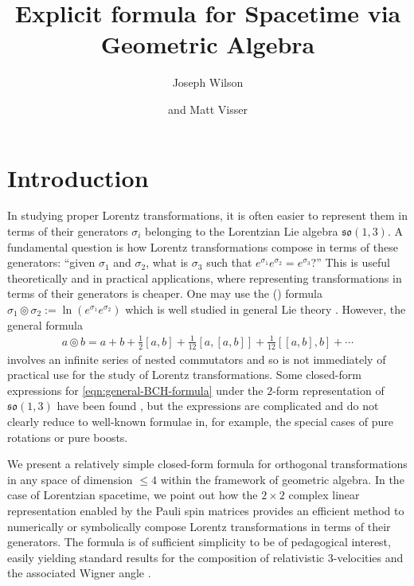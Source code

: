 \documentclass[12pt,a4paper]{article}
\title{Explicit \x{BCH full} formula for Spacetime via Geometric Algebra}
\author{Joseph Wilson \orcidJoseph}
\author{{\sf and} Matt Visser \orcidMatt}
\affiliation{
	School of Mathematics and Statistics, Victoria University of Wellington,
\\	\null\qquad PO Box 600, Wellington 6140, New Zealand
\\[2ex]	\toself{Compiled on \today\ at \currenttime.}
}
\makeatletter
\newcommand\x[1]{\@nameuse{\detokenize{#1}}}
\newcommand{\so}{\mathfrak{so}}
\newcommand{\bch}[2]{#1 \circledcirc #2}
\makeatother
\begin{document}
\maketitle

\clearpage

\section{Introduction}
\label{sec:intro}

In studying proper Lorentz transformations, it is often easier to represent them in terms of their generators $\sigma{}_i$ belonging to the Lorentzian Lie algebra $\mathfrak{so}(1,3)$.
A fundamental question is how Lorentz transformations compose in terms of these generators: ``given $\sigma{}_1$ and $\sigma{}_2$, what is $\sigma{}_3$ such that $e^{\sigma{}_1}e^{\sigma{}_2} = e^{\sigma{}_3}$?''
This is useful theoretically and in practical applications, where representing transformations in terms of their generators is cheaper.
One may use the \x{BCH full} (\x{BCH}) formula $\bch{\sigma{}_1}{\sigma{}_2} :={} \ln(e^{\sigma{}_1}e^{\sigma{}_2})$ which is well studied in general Lie theory \cite{achilles2012bch-early}.
However, the general \x{BCH} formula
\begin{align}
	\bch{a}{b} = a + b + \frac12[a, b] + \frac{1}{12}[a, [a, b]] + \frac{1}{12}[[a, b], b] + \cdots
	\label{eqn:general-BCH-formula}
\end{align}
involves an infinite series of nested commutators and so is not immediately of practical use for the study of Lorentz transformations.
Some closed-form expressions for \eqref{eqn:general-BCH-formula} under the $2$-form representation of $\so(1,3)$ have been found \cite{coll2002sr-generator-composition,coll1990sr-generator-exponentiation}, but the expressions are complicated and do not clearly reduce to well-known formulae in, for example, the special cases of pure rotations or pure boosts.

We present a relatively simple closed-form \x{BCH} formula for orthogonal transformations in any space of dimension $\leq{}4$ within the framework of geometric algebra.
In the case of Lorentzian spacetime, we point out how the $2\times{}2$ complex linear representation enabled by the Pauli spin matrices provides an efficient method to numerically or symbolically compose Lorentz transformations in terms of their generators.
The formula is of sufficient simplicity to be of pedagogical interest, easily yielding standard results for the composition of relativistic $3$-velocities and the associated Wigner angle \cite{berry2020quat-sr,visser2011sr-velocity-composition,wigner1939unitary}.
\end{document}
